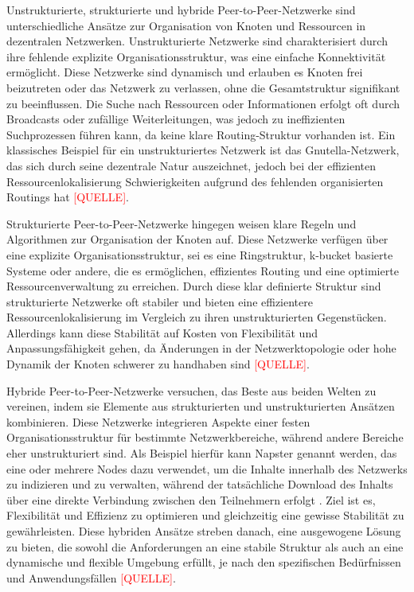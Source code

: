\noindent Unstrukturierte, strukturierte und hybride Peer-to-Peer-Netzwerke sind unterschiedliche Ansätze zur Organisation von Knoten und Ressourcen in dezentralen Netzwerken. Unstrukturierte Netzwerke sind charakterisiert durch ihre fehlende explizite Organisationsstruktur, was eine einfache Konnektivität ermöglicht. Diese Netzwerke sind dynamisch und erlauben es Knoten frei beizutreten oder das Netzwerk zu verlassen, ohne die Gesamtstruktur signifikant zu beeinflussen. Die Suche nach Ressourcen oder Informationen erfolgt oft durch Broadcasts oder zufällige Weiterleitungen, was jedoch zu ineffizienten Suchprozessen führen kann, da keine klare Routing-Struktur vorhanden ist. Ein klassisches Beispiel für ein unstrukturiertes Netzwerk ist das Gnutella-Netzwerk, das sich durch seine dezentrale Natur auszeichnet, jedoch bei der effizienten Ressourcenlokalisierung Schwierigkeiten aufgrund des fehlenden organisierten Routings hat \textcolor{red}{[QUELLE]}.

Strukturierte Peer-to-Peer-Netzwerke hingegen weisen klare Regeln und Algorithmen zur Organisation der Knoten auf. Diese Netzwerke verfügen über eine explizite Organisationsstruktur, sei es eine Ringstruktur, k-bucket basierte Systeme oder andere, die es ermöglichen, effizientes Routing und eine optimierte Ressourcenverwaltung zu erreichen. Durch diese klar definierte Struktur sind strukturierte Netzwerke oft stabiler und bieten eine effizientere Ressourcenlokalisierung im Vergleich zu ihren unstrukturierten Gegenstücken. Allerdings kann diese Stabilität auf Kosten von Flexibilität und Anpassungsfähigkeit gehen, da Änderungen in der Netzwerktopologie oder hohe Dynamik der Knoten schwerer zu handhaben sind \textcolor{red}{[QUELLE]}.

Hybride Peer-to-Peer-Netzwerke versuchen, das Beste aus beiden Welten zu vereinen, indem sie Elemente aus strukturierten und unstrukturierten Ansätzen kombinieren. Diese Netzwerke integrieren Aspekte einer festen Organisationsstruktur für bestimmte Netzwerkbereiche, während andere Bereiche eher unstrukturiert sind. Als Beispiel hierfür kann Napster genannt werden, das eine oder mehrere Nodes dazu verwendet, um die Inhalte innerhalb des Netzwerks zu indizieren und zu verwalten, während der tatsächliche Download des Inhalts über eine direkte Verbindung zwischen den Teilnehmern erfolgt \parencite{Yang_ComparingHybridP2PSystems}.
Ziel ist es, Flexibilität und Effizienz zu optimieren und gleichzeitig eine gewisse Stabilität zu gewährleisten. Diese hybriden Ansätze streben danach, eine ausgewogene Lösung zu bieten, die sowohl die Anforderungen an eine stabile Struktur als auch an eine dynamische und flexible Umgebung erfüllt, je nach den spezifischen Bedürfnissen und Anwendungsfällen \textcolor{red}{[QUELLE]}.

